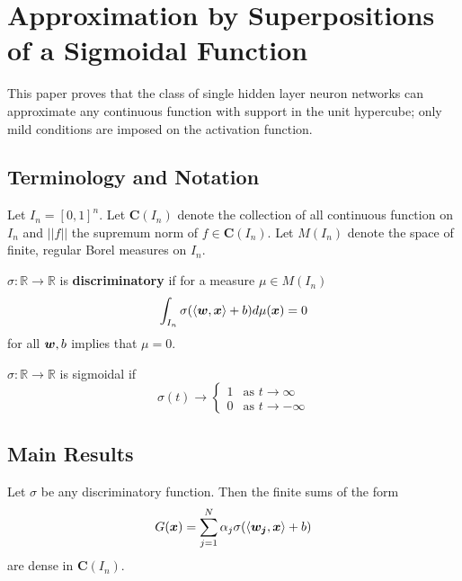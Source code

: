 \section{Approximation by Superpositions of a Sigmoidal Function}
This paper\cite{cybenko_1989} proves that the class of single hidden layer neuron networks can approximate any
continuous function with support in the unit hypercube; only mild conditions are imposed on the activation
function.

\subsection{Terminology and Notation}
Let $I_n = {[0, 1]}^n$. Let $\boldsymbol{C}(I_n)$ denote the collection of all continuous function on $I_n$
and $||f||$ the supremum norm of $f \in \boldsymbol{C}(I_n)$. Let $M(I_n)$ denote the space of finite, 
 regular Borel measures on $I_n$.

\begin{df}
    $\sigma: \mathbb{R} \longrightarrow \mathbb{R}$ is \textbf{discriminatory} if for a measure 
    $\mu \in M(I_n)$ 
    $$\int_{I_n} \sigma(\langle \boldsymbol{w}, \boldsymbol{x}\rangle + b) d\mu(\boldsymbol{x}) = 0$$
    for all $\boldsymbol{w}, b$ implies that $\mu = 0$.
\end{df}

\begin{df}
    $\sigma: \mathbb{R} \longrightarrow \mathbb{R}$ is sigmoidal if 
    \begin{equation*}
        \sigma(t) \to 
        \begin{cases}
            1 & \text{as $t \to \infty$}\\
            0 & \text{as $t \to -\infty$}
        \end{cases}
    \end{equation*}
\end{df}

\subsection{Main Results}

\begin{thm}[THM 1]
    Let $\sigma$ be any  discriminatory function. Then the finite sums of the form
    \begin{equation}
        G(\boldsymbol{x}) = \sum_{j=1}^N \alpha_j\sigma(\langle \boldsymbol{w_j}, \boldsymbol{x}\rangle + b)
    \end{equation}
    are dense in $\boldsymbol{C}(I_n)$.
\end{thm}

